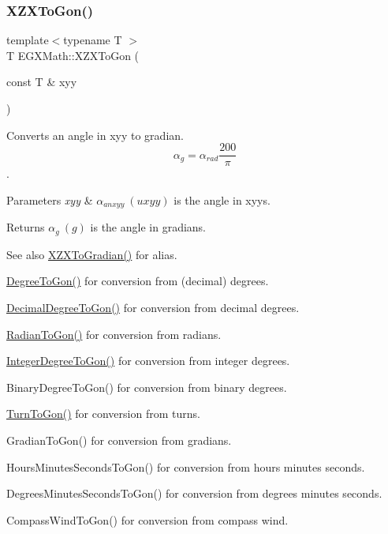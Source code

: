 \subsubsection{\texorpdfstring{X\+Z\+X\+To\+Gon()}{XZXToGon()}}
{\footnotesize\ttfamily template$<$typename T $>$ \\
T E\+G\+X\+Math\+::\+X\+Z\+X\+To\+Gon (\begin{DoxyParamCaption}\item[{const T \&}]{xyy }\end{DoxyParamCaption})}



Converts an angle in xyy to gradian. \[\alpha_{g}=\alpha_{rad}\frac{200}{\pi}\]. 


\begin{DoxyParams}{Parameters}
{\em xyy} & $\alpha_{anxyy}\ (uxyy)$ is the angle in xyys. \\
\hline
\end{DoxyParams}
\begin{DoxyReturn}{Returns}
$\alpha_{g}\ (g)$ is the angle in gradians. 
\end{DoxyReturn}
\begin{DoxySeeAlso}{See also}
\mbox{\hyperlink{group___e_g_x_math-_angle_conversions-_x_z_x_ga91288ab3da9655e8ac1e3db44f9620a4}{X\+Z\+X\+To\+Gradian()}} for alias. 

\mbox{\hyperlink{group___e_g_x_math-_angle_conversions-_degree_ga87c3fab0867021e5d2501197b4db6194}{Degree\+To\+Gon()}} for conversion from (decimal) degrees. 

\mbox{\hyperlink{group___e_g_x_math-_angle_conversions-_decimal_degree_gaeb333a1ad0aeb913c025fbd1be85fcb3}{Decimal\+Degree\+To\+Gon()}} for conversion from decimal degrees. 

\mbox{\hyperlink{group___e_g_x_math-_angle_conversions-_radian_ga36912e5a810b64c271c4dafc17f4ca45}{Radian\+To\+Gon()}} for conversion from radians. 

\mbox{\hyperlink{group___e_g_x_math-_angle_conversions-_integer_degree_ga6e5be425c37ad27319f09329156c64bb}{Integer\+Degree\+To\+Gon()}} for conversion from integer degrees. 

Binary\+Degree\+To\+Gon() for conversion from binary degrees. 

\mbox{\hyperlink{group___e_g_x_math-_angle_conversions-_turn_gad81dd0bb1660ef24e28fa15b2403dec7}{Turn\+To\+Gon()}} for conversion from turns. 

Gradian\+To\+Gon() for conversion from gradians. 

Hours\+Minutes\+Seconds\+To\+Gon() for conversion from hours minutes seconds. 

Degrees\+Minutes\+Seconds\+To\+Gon() for conversion from degrees minutes seconds. 

Compass\+Wind\+To\+Gon() for conversion from compass wind. 
\end{DoxySeeAlso}
